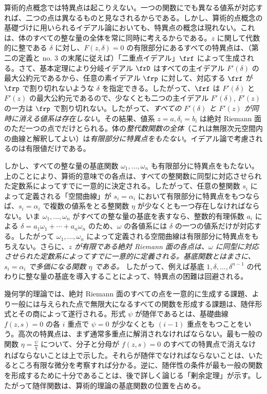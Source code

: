 \documentclass[11pt]{article}
\begin{document}
算術的点概念では特異点は起こりえない。一つの関数にでも異なる値系が対応すれば、二つの点は異なるものと見なされるからである。しかし、算術的点概念の基礎づけに用いられるイデアル論においても、特異点の概念は現れない。これは、体のすべての整な量の全体を常に同時に考えるからである。\(z\) に関して代数的に整である \(\delta\) に対し、\(F(z,\delta)=0\) の有限部分にあるすべての特異点は、（第二の定義と no. 3 の末尾に従えば）「二重点イデアル」\(\frf\) によって生成される。さて、基本定理により分岐イデアル \(\frD\) はすべての主イデアル \(F'(\delta)\) の最大公約元であるから、任意の素イデアル \(\frp\) に対して、対応する \(\frf\) が \(\frp\) で割り切れないような \(\delta\) を指定できる。したがって、\(\frf\) は \(F'(\delta)\) と \(F'(z)\) の最大公約元であるので、少なくとも二つの主イデアル \(F'(\delta)\), \(F'(z)\) の一方は \(\frp\) で割り切れない。したがって、\emph{すべての \(F'(\delta)\) と \(F'(z)\) が同時に消える値系は存在しない}。その結果、値系 \(z=a,\delta_i=b_i\) は絶対 Riemann 面のただ一つの点でだけとられる。体の\emph{整代数関数の全体}（これは無限次元空間内の曲線と解釈してよい）は\emph{有限部分に特異点をもたない}。イデアル論で考慮されるのは有限値だけである。

しかし、すべての整な量の基底関数 \(\omega_1,\ldots,\omega_n\) も有限部分に特異点をもたない。上のことにより、算術的意味での各点は、すべての整関数に同型に対応させられた定数系によってすでに一意的に決定される。したがって、任意の整関数 \(s_i\) によって定義される「空間曲線」が \(s_i=\alpha_i\) において有限部分に特異点をもつならば、\(s_i=\alpha_i\) で複数の値系をとる整関数 \(\eta\) が少なくとも一つ存在しなければならない。いま \(\omega_1,\ldots,\omega_n\) がすべての整な量の基底を表すなら、整数的有理係数 \(a_i\) による \(\delta=a_1\omega_1+\cdots+a_n\omega_n\) のため、\(\omega\) の各値系には \(\delta\) の一つの値系だけが対応する。したがって \(\omega_1,\ldots,\omega_n\) によって定義される空間曲線は有限部分に特異点をもちえない。さらに、\emph{\(z\) が有限である絶対 Riemann 面の各点は、\(\omega\) に同型に対応させられた定数系によってすでに一意的に定義される。基底関数とはまさに、\(s_i=\alpha_i\) で多価になる関数 \(\eta\) である。} したがって、例えば基底 \(1,\delta,\ldots,\delta^{n-1}\) の代わりに整な量の基底を導入することによって、特異点の困難は回避される。

幾何学的理論では、絶対 Riemann 面のすべての点を一意的に生成する課題、より一般には与えられた点で無限大になるすべての関数を形成する課題は、随伴形式とその商によって遂行される。形式 \(\psi\) が随伴であるとは、基礎曲線 \(f(z,s)=0\) の各 \(i\) 重点で \(\psi=0\) が少なくとも \((i-1)\) 重点をもつことをいう。高次の特異点は、まず通常多重点に解消されなければならない。最も一般の関数 \(\eta=\frac{\psi}{\chi}\) について、分子と分母が \(f(z,s)=0\) のすべての特異点で消えなければならないことは上で示した。それらが随伴でなければならないことは、いたるところ有限な微分を考察すれば分かる。逆に、随伴性の条件が最も一般の関数を形成するために十分であることは、後で詳しく論じる「剰余定理」が示す。したがって随伴関数は、算術的理論の基底関数の位置を占める。
\end{document}
